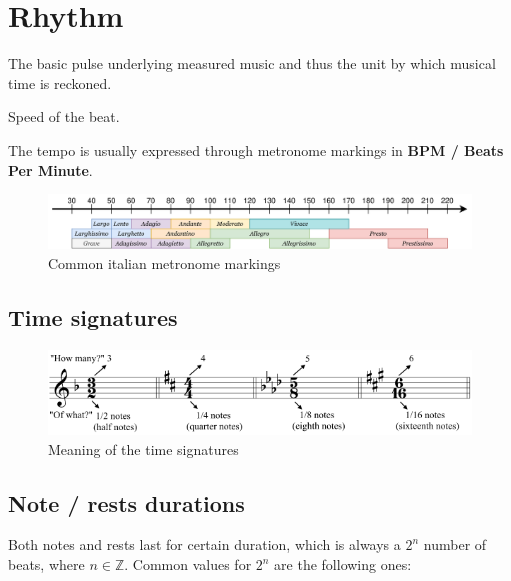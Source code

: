 \section{Rhythm}
\begin{definition}
    The basic pulse underlying measured music and thus the unit by which musical time is reckoned.
\end{definition}

\begin{definition}[Tempo]
    Speed of the beat.
\end{definition}
The tempo is usually expressed through metronome markings in \textbf{BPM / Beats Per Minute}.

\begin{figure}
    \begin{center}
        \includegraphics[width=\textwidth]{img/timeline-tempo}
        \caption{Common italian metronome markings}
    \end{center}
\end{figure}

\subsection{Time signatures}

\begin{figure}[h]
    \begin{center}
        \includegraphics[width=1\textwidth]{img/timesignature}
        \caption{Meaning of the time signatures}
    \end{center}
\end{figure}

\subsection{Note / rests durations}
Both notes and rests last for certain duration, which is always a $2^n$ number of beats, where $n \in \mathbb Z$. Common values for $2^n$ are the following ones:

